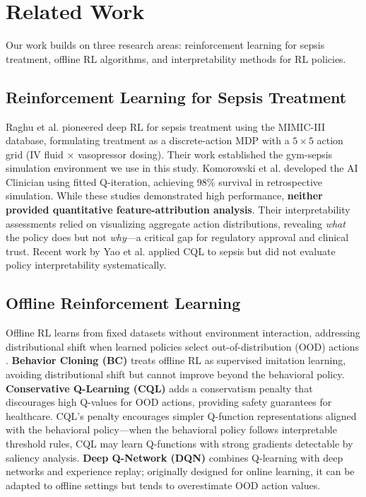 
\section{Related Work}\label{sec:related}

Our work builds on three research areas: reinforcement learning for sepsis treatment, offline RL algorithms, and interpretability methods for RL policies.

\subsection{Reinforcement Learning for Sepsis Treatment}\label{sec:related:sepsis}

Raghu et al. \citeyearpar{raghu2017sepsis_drl} pioneered deep RL for sepsis treatment using the MIMIC-III database, formulating treatment as a discrete-action MDP with a $5 \times 5$ action grid (IV fluid × vasopressor dosing). Their work established the gym-sepsis simulation environment we use in this study. Komorowski et al. \citeyearpar{komorowski2018ai_clinician} developed the AI Clinician using fitted Q-iteration, achieving 98\% survival in retrospective simulation. While these studies demonstrated high performance, \textbf{neither provided quantitative feature-attribution analysis}. Their interpretability assessments relied on visualizing aggregate action distributions, revealing \textit{what} the policy does but not \textit{why}—a critical gap for regulatory approval and clinical trust. Recent work by Yao et al. \citeyearpar{yao2021sepsis_cql} applied CQL to sepsis but did not evaluate policy interpretability systematically.


\subsection{Offline Reinforcement Learning}\label{sec:related:offline}

Offline RL learns from fixed datasets without environment interaction, addressing distributional shift when learned policies select out-of-distribution (OOD) actions \citep{levine2020offline}. \textbf{Behavior Cloning (BC)} \citep{pomerleau1991bc} treats offline RL as supervised imitation learning, avoiding distributional shift but cannot improve beyond the behavioral policy. \textbf{Conservative Q-Learning (CQL)} \citep{kumar2020cql} adds a conservatism penalty that discourages high Q-values for OOD actions, providing safety guarantees for healthcare. CQL's penalty encourages simpler Q-function representations aligned with the behavioral policy—when the behavioral policy follows interpretable threshold rules, CQL may learn Q-functions with strong gradients detectable by saliency analysis. \textbf{Deep Q-Network (DQN)} \citep{mnih2015dqn} combines Q-learning with deep networks and experience replay; originally designed for online learning, it can be adapted to offline settings but tends to overestimate OOD action values.


